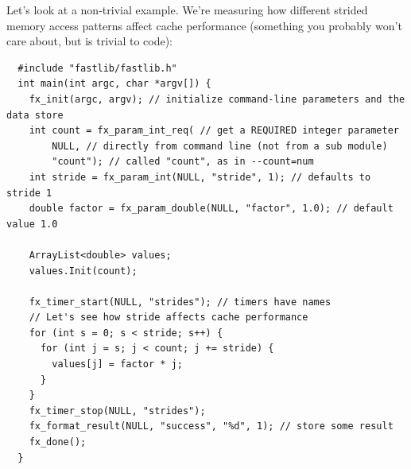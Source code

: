 \documentclass[letter]{report}
\begin{document}
Let's look at a non-trivial example. We're measuring how different strided memory access patterns affect cache performance (something you probably won't care about, but is trivial to code):
\begin{verbatim}
  #include "fastlib/fastlib.h"
  int main(int argc, char *argv[]) {
    fx_init(argc, argv); // initialize command-line parameters and the data store
    int count = fx_param_int_req( // get a REQUIRED integer parameter
        NULL, // directly from command line (not from a sub module)
        "count"); // called "count", as in --count=num
    int stride = fx_param_int(NULL, "stride", 1); // defaults to stride 1
    double factor = fx_param_double(NULL, "factor", 1.0); // default value 1.0
  
    ArrayList<double> values;
    values.Init(count);

    fx_timer_start(NULL, "strides"); // timers have names
    // Let's see how stride affects cache performance
    for (int s = 0; s < stride; s++) {
      for (int j = s; j < count; j += stride) {
        values[j] = factor * j;
      }
    }
    fx_timer_stop(NULL, "strides");
    fx_format_result(NULL, "success", "%d", 1); // store some result
    fx_done();
  }
\end{verbatim}
\end{document}
